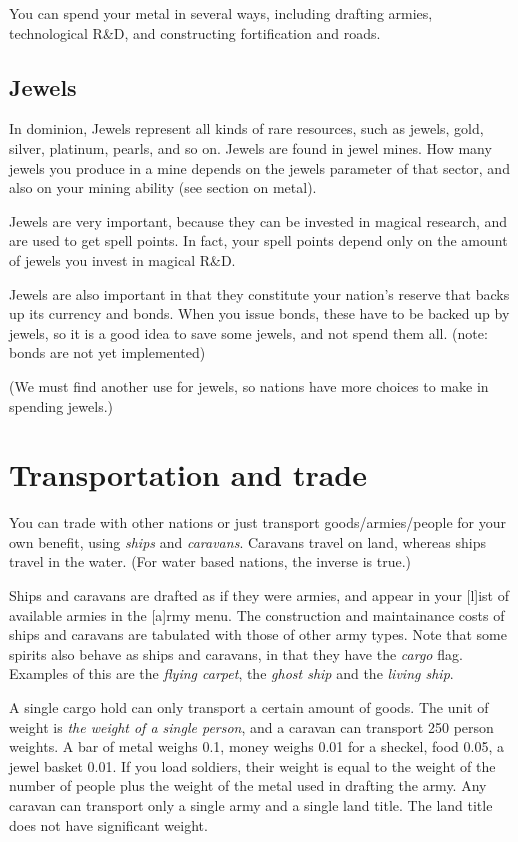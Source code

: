 You can spend your metal in several ways, including drafting armies,
technological R\&D, and constructing fortification and roads.

\subsection{Jewels}
In dominion, Jewels represent all kinds of rare resources, such as jewels,
gold, silver, platinum, pearls, and so on.  Jewels are found in jewel
mines.  How many jewels you produce in a mine depends on the jewels
parameter of that sector, and also on your mining ability (see section
on metal).

Jewels are very important, because they can be invested in magical
research, and are used to get spell points.  In fact, your spell
points depend only on the amount of jewels you invest in magical R\&D.

Jewels are also important in that they constitute your nation's
reserve that backs up its currency and bonds.  When you issue bonds,
these have to be backed up by jewels, so it is a good idea to save
some jewels, and not spend them all. (note: bonds are not yet
implemented)

(We must find another use for jewels, so nations have more choices to
make in spending jewels.)

\section{Transportation and trade}
You can trade with other nations or just transport goods/armies/people
for your own benefit, using {\em ships} and {\em caravans}.  Caravans
travel on land, whereas ships travel in the water. (For water based
nations, the inverse is true.)

Ships and caravans are drafted as if they were armies, and appear in
your [l]ist of available armies in the [a]rmy menu.  The construction
and maintainance costs of ships and caravans are tabulated with those
of other army types.  Note that some spirits also behave as ships and
caravans, in that they have the {\em cargo} flag.  Examples of this are
the {\em flying carpet}, the {\em ghost ship} and the {\em living
ship}.

A single cargo hold can only transport a certain amount of goods.  The
unit of weight is {\em the weight of a single person}, and a caravan
can transport 250 person weights.  A bar of metal weighs 0.1, money
weighs 0.01 for a sheckel, food 0.05, a jewel basket 0.01.  If you
load soldiers, their weight is equal to the weight of the number of
people plus the weight of the metal used in drafting the army.  Any
caravan can transport only a single army and a single land title.  The
land title does not have significant weight.

